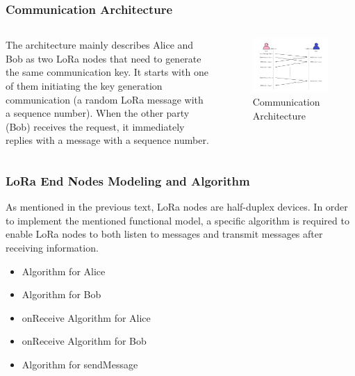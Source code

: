 \documentclass{beamer}
\begin{document}
\begin{frame}
  \frametitle{Communication Architecture}
  \begin{columns}

    The architecture mainly describes Alice and Bob as two LoRa nodes that need to generate the same communication key. It starts with one of them initiating the key generation communication (a random LoRa message with a sequence number). When the other party (Bob) receives the request, it immediately replies with a message with a sequence number.
    
    \begin{figure}
      \centering
      \includegraphics[width=1\linewidth]{../figures/fig4-1.png}
      \caption{Communication Architecture}
      \label{fig:4-1}
    \end{figure}
    \end{columns}
\end{frame}

\begin{frame}
  \frametitle{LoRa End Nodes Modeling and Algorithm}

  As mentioned in the previous text, LoRa nodes are half-duplex devices. In order to implement the mentioned functional model, a specific algorithm is required to enable LoRa nodes to both listen to messages and transmit messages after receiving information.
  \begin{itemize}
    \item Algorithm for Alice
    \item Algorithm for Bob
    \item onReceive Algorithm for Alice
    \item onReceive Algorithm for Bob
    \item Algorithm for sendMessage
  \end{itemize}
\end{frame}
\end{document}
